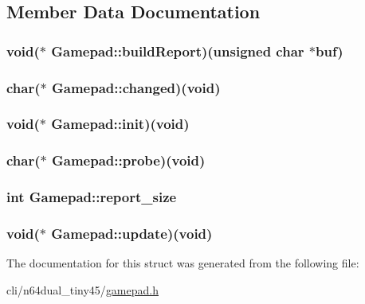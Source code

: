 \subsection{Member Data Documentation}
\hypertarget{structGamepad_a04602b8c82f9c76dd8c11702b7b005e0}{
\subsubsection[{build\-Report}]{\setlength{\rightskip}{0pt plus 5cm}void($\ast$ Gamepad\-::build\-Report)(unsigned char $\ast$buf)}}\label{structGamepad_a04602b8c82f9c76dd8c11702b7b005e0}
\hypertarget{structGamepad_a7fe2b8af15ce80e066d6aff5b6d8ff76}{
\subsubsection[{changed}]{\setlength{\rightskip}{0pt plus 5cm}char($\ast$ Gamepad\-::changed)(void)}}\label{structGamepad_a7fe2b8af15ce80e066d6aff5b6d8ff76}
\hypertarget{structGamepad_ae77fcd29997e6b061793c5366d86e13d}{
\subsubsection[{init}]{\setlength{\rightskip}{0pt plus 5cm}void($\ast$ Gamepad\-::init)(void)}}\label{structGamepad_ae77fcd29997e6b061793c5366d86e13d}
\hypertarget{structGamepad_ae480cefcc3b44ce77354c784ed57e94e}{
\subsubsection[{probe}]{\setlength{\rightskip}{0pt plus 5cm}char($\ast$ Gamepad\-::probe)(void)}}\label{structGamepad_ae480cefcc3b44ce77354c784ed57e94e}
\hypertarget{structGamepad_ac3bd57ce0da59a790922a091b5d71462}{
\subsubsection[{report\-\_\-size}]{\setlength{\rightskip}{0pt plus 5cm}int Gamepad\-::report\-\_\-size}}\label{structGamepad_ac3bd57ce0da59a790922a091b5d71462}
\hypertarget{structGamepad_a0efbe7e746fb47724e72ab89f442114b}{
\subsubsection[{update}]{\setlength{\rightskip}{0pt plus 5cm}void($\ast$ Gamepad\-::update)(void)}}\label{structGamepad_a0efbe7e746fb47724e72ab89f442114b}


The documentation for this struct was generated from the following file\-:\begin{DoxyCompactItemize}
\item 
cli/n64dual\-\_\-tiny45/\hyperlink{gamepad_8h}{gamepad.\-h}\end{DoxyCompactItemize}
